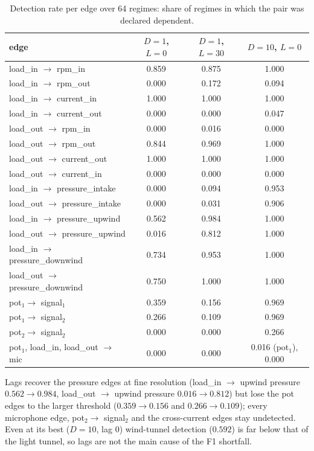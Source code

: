 \begin{table}[h]
\caption{Detection rate per edge over 64 regimes: share of regimes in which the pair was declared dependent.}
\label{tab:e2edges}
\centering\small
\begin{tabular}{lccc}
\toprule
edge & $D{=}1$, $L{=}0$ & $D{=}1$, $L{=}30$ & $D{=}10$, $L{=}0$ \\
\midrule
load\_in $\to$ rpm\_in & 0.859 & 0.875 & 1.000 \\
load\_in $\to$ rpm\_out & 0.000 & 0.172 & 0.094 \\
load\_in $\to$ current\_in & 1.000 & 1.000 & 1.000 \\
load\_in $\to$ current\_out & 0.000 & 0.000 & 0.047 \\
load\_out $\to$ rpm\_in & 0.000 & 0.016 & 0.000 \\
load\_out $\to$ rpm\_out & 0.844 & 0.969 & 1.000 \\
load\_out $\to$ current\_out & 1.000 & 1.000 & 1.000 \\
load\_out $\to$ current\_in & 0.000 & 0.000 & 0.000 \\
load\_in $\to$ pressure\_intake & 0.000 & 0.094 & 0.953 \\
load\_out $\to$ pressure\_intake & 0.000 & 0.031 & 0.906 \\
load\_in $\to$ pressure\_upwind & 0.562 & 0.984 & 1.000 \\
load\_out $\to$ pressure\_upwind & 0.016 & 0.812 & 1.000 \\
load\_in $\to$ pressure\_downwind & 0.734 & 0.953 & 1.000 \\
load\_out $\to$ pressure\_downwind & 0.750 & 1.000 & 1.000 \\
pot$_1\to$ signal$_1$ & 0.359 & 0.156 & 0.969 \\
pot$_1\to$ signal$_2$ & 0.266 & 0.109 & 0.969 \\
pot$_2\to$ signal$_2$ & 0.000 & 0.000 & 0.266 \\
pot$_1$, load\_in, load\_out $\to$ mic & 0.000 & 0.000 & 0.016 (pot$_1$), 0.000 \\
\bottomrule
\end{tabular}
\end{table}

Lags recover the pressure edges at fine resolution (load\_\allowbreak in $\to$ upwind pressure $0.562\to0.984$, load\_\allowbreak out $\to$ upwind pressure $0.016\to0.812$) but lose the pot edges to the larger threshold ($0.359\to0.156$ and $0.266\to0.109$); every microphone edge, pot$_2\to$ signal$_2$ and the cross-current edges stay undetected.
Even at its best ($D=10$, lag 0) wind-tunnel detection ($0.592$) is far below that of the light tunnel, so lags are not the main cause of the F1 shortfall.

